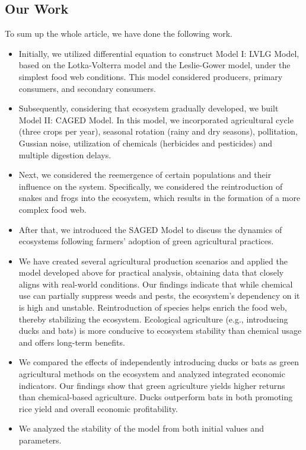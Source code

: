\documentclass{HZNUMCM}
\begin{document}
    \subsection{Our Work}
      To sum up the whole article, we have done the following work.
    \begin{itemize}
      \item Initially, we utilized differential equation to construct Model I: 
      LVLG Model, based on the Lotka-Volterra model and the Leslie-Gower model, 
      under the simplest food web conditions. This model considered producers, primary consumers, and secondary consumers.
      \item Subsequently, considering that ecosystem gradually developed, we built Model II: CAGED Model. 
      In this model, we incorporated agricultural cycle (three crops per year), 
      seasonal rotation (rainy and dry seasons), pollitation, Gussian noise, utilization of chemicals (herbicides and pesticides) and multiple digestion delays. 
      \item Next, we considered the reemergence of certain populations and their influence on the system. Specifically, we considered the reintroduction of snakes and frogs into the ecosystem, 
      which results in the formation of a more complex food web.
      \item After that, we introduced the SAGED Model to discuss the dynamics of ecosystems following farmers' adoption of green agricultural practices.
      \item We have created several agricultural production scenarios and applied the model developed above for practical analysis, 
      obtaining data that closely aligns with real-world conditions. 
      Our findings indicate that while chemical use can partially suppress weeds and pests, 
      the ecosystem's dependency on it is high and unstable. Reintroduction of species helps enrich the food web, 
      thereby stabilizing the ecosystem. 
      Ecological agriculture (e.g., introducing ducks and bats) is more conducive to ecosystem stability than chemical usage and offers long-term benefits. 
      \item We compared the effects of independently introducing ducks or bats as green agricultural methods on the ecosystem and analyzed integrated economic indicators. 
      Our findings show that green agriculture yields higher returns than chemical-based agriculture. 
      Ducks outperform bats in both promoting rice yield and overall economic profitability.
      \item We analyzed the stability of the model from both initial values and parameters. 

\end{itemize}
\end{document}
